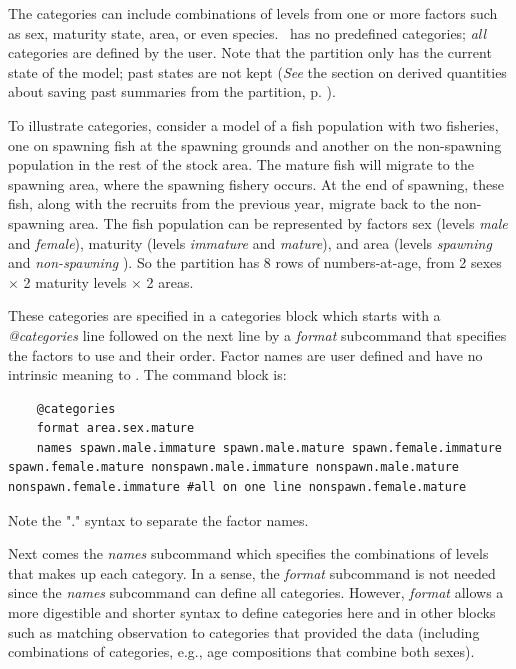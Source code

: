 The categories can include combinations of levels from one or more factors such as sex, maturity state, area, or even species. \CNAME\ has no predefined categories; \emph{all} categories are defined by the user. Note that the partition only has the current state of the model; past states are not kept (\textit{See} the section on derived quantities about saving past summaries from the partition, p. \pageref{sec:DerivedQuantity}).

To illustrate categories, consider a model of a fish population with two fisheries, one on spawning fish at the spawning grounds and another on the non-spawning population in the rest of the stock area. The mature fish will migrate to the spawning area, where the spawning fishery occurs. At the end of spawning, these fish, along with the recruits from the previous year, migrate back to the non-spawning area. The fish population can be represented  by factors sex (levels \textit{male} and \textit{female}), maturity (levels \textit{immature} and \textit{mature}), and area (levels \textit{spawning} and \textit{non-spawning} ). So the partition has 8 rows of numbers-at-age, from 2 sexes $\times$ 2 maturity levels $\times$ 2 areas.

These categories are specified in a categories block which starts with a \textit{@categories} line followed on the next line by a \textit{format} subcommand that specifies the factors to use and their order. Factor names are user defined and have no intrinsic meaning to \CNAME. The command block is:

{\small{\begin{lstlisting}
	@categories
	format area.sex.mature
	names spawn.male.immature spawn.male.mature spawn.female.immature spawn.female.mature nonspawn.male.immature nonspawn.male.mature nonspawn.female.immature #all on one line nonspawn.female.mature
\end{lstlisting}}}  %

Note the "." syntax to separate the factor names.

Next comes the \textit{names} subcommand which specifies the combinations of levels that makes up each category. In a sense, the \textit{format} subcommand is not needed since the \textit{names} subcommand can define all categories. However, \textit{format} allows a more  digestible and shorter syntax to define categories here and in other blocks such as matching observation to categories that provided the data (including combinations of categories, e.g., age compositions that combine both sexes).

